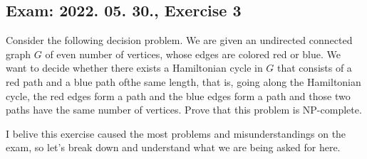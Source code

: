 \subsection{Exam: 2022. 05. 30., Exercise 3}

\label{exam_2022_05_30_exercise_3}


Consider the following decision problem. We are given an undirected connected
graph $G$ of even number of vertices, whose edges are colored red or blue.
We want to decide whether there exists a Hamiltonian cycle in $G$ that consists
of a red path and a blue path ofthe same length, that is, going along the
Hamiltonian cycle, the red edges form a path and the blue edges form a path
and those two paths have the same number of vertices. Prove that this problem
is NP-complete.


I belive this exercise caused the most problems and misunderstandings on the exam,
so let's break down and understand what we are being asked for here.

